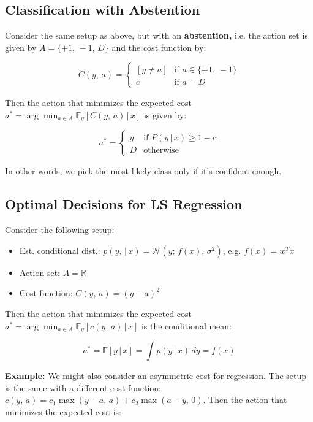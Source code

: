 \documentclass[a4paper]{extarticle}
\begin{document}
\subsection{Classification with Abstention}

Consider the same setup as above, but with an \textbf{abstention,} i.e. the action set is given by $A = \{+1, \, -1, \, D\}$ and the cost function by:

\[
    C(y, \, a) = \begin{cases}
        [y \neq a] &\text{if } a \in \{+1, \, -1\}\\
        c &\text{if } a = D
    \end{cases}
\]

Then the action that minimizes the expected cost $a^* = \arg \min_{a \in A} \mathbb{E}_y[C(y, \, a) \, | \, x]$ is given by:

\[
    a^* = \begin{cases}
        y &\text{if } P(y \, | \, x) \geq 1 - c\\
        D &\text{otherwise}
    \end{cases}
\]

In other words, we pick the most likely class only if it's confident enough.

\subsection{Optimal Decisions for LS Regression}

Consider the following setup:
\begin{itemize}
    \item Est. conditional dist.: $p(y, \, | \, x) = \mathcal{N}(y; \, f(x), \, \sigma^2)$, e.g. $f(x) = w^Tx$
    \item Action set: $A = \mathbb{R}$
    \item Cost function: $C(y, \, a) = (y - a)^2$
\end{itemize}

Then the action that minimizes the expected cost $a^* = \arg \min_{a \in A} \mathbb{E}_y[c(y, \, a) \, | \, x]$ is the conditional mean:

\[
    a^* = \mathbb{E}[y \, | \, x] = \int p(y \, | \, x) \, dy = f(x)
\]

\textbf{Example:} We might also consider an asymmetric cost for regression. The setup is the same with a different cost function: $c(y, \, a) = c_1 \max(y - a, \, a) + c_2 \max(a - y, \, 0)$. Then the action that minimizes the expected cost is:
\end{document}
